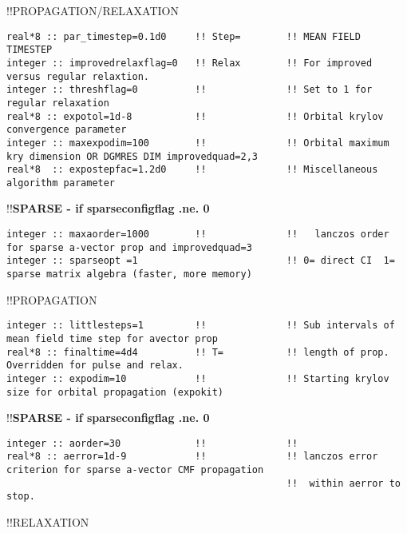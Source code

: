 !!{\large \quad PROPAGATION/RELAXATION}
\begin{verbatim}
real*8 :: par_timestep=0.1d0     !! Step=        !! MEAN FIELD TIMESTEP
integer :: improvedrelaxflag=0   !! Relax        !! For improved versus regular relaxtion.   
integer :: threshflag=0          !!              !! Set to 1 for regular relaxation
real*8 :: expotol=1d-8           !!              !! Orbital krylov convergence parameter
integer :: maxexpodim=100        !!              !! Orbital maximum kry dimension OR DGMRES DIM improvedquad=2,3
real*8  :: expostepfac=1.2d0     !!              !! Miscellaneous algorithm parameter
\end{verbatim}
!!\textbf{\qquad SPARSE - if sparseconfigflag .ne. 0}
\begin{verbatim}
integer :: maxaorder=1000        !!              !!   lanczos order for sparse a-vector prop and improvedquad=3
integer :: sparseopt =1                          !! 0= direct CI  1= sparse matrix algebra (faster, more memory)
\end{verbatim}
!!{\large \quad PROPAGATION}
\begin{verbatim}
integer :: littlesteps=1         !!              !! Sub intervals of mean field time step for avector prop
real*8 :: finaltime=4d4          !! T=           !! length of prop.  Overridden for pulse and relax.  
integer :: expodim=10            !!              !! Starting krylov size for orbital propagation (expokit)
\end{verbatim}
!!\textbf{\qquad SPARSE - if sparseconfigflag .ne. 0}
\begin{verbatim}
integer :: aorder=30             !!              !!   
real*8 :: aerror=1d-9            !!              !! lanczos error criterion for sparse a-vector CMF propagation
                                                 !!  within aerror to stop.
\end{verbatim}
!!{\large \quad RELAXATION}
